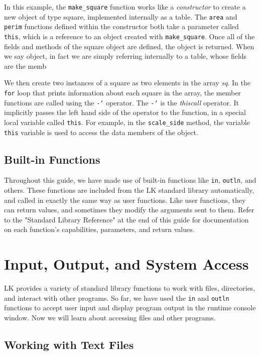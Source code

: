 \documentclass{article}
\newcommand\gt{\char`\>}
\begin{document}
In this example, the \texttt{make\_square} function works like a \emph{constructor} to create a new object of type square, implemented internally as a table.  The \texttt{area} and \texttt{perim} functions defined within the constructor both take a parameter called \texttt{this}, which is a reference to an object created with \texttt{make\_square}.  Once all of the fields and methods of the square object are defined, the object is returned.  When we say object, in fact we are simply referring internally to a table, whose fields are the memb

We then create two instances of a square as two elements in the array \emph{sq}.  In the \texttt{for} loop that prints information about each square in the array, the member functions are called using the \texttt{-\gt} operator.  The \texttt{-\gt} is the \emph{thiscall} operator.  It implicitly passes the left hand side of the operator to the function, in a special local variable called \texttt{this}.  For example, in the \texttt{scale\_side} method, the variable \texttt{this} variable is used to access the data members of the object.

\subsection{Built-in Functions}

Throughout this guide, we have made use of built-in functions like \texttt{in}, \texttt{outln}, and others.  These functions are included from the LK standard library automatically, and called in exactly the same way as user functions.  Like user functions, they can return values, and sometimes they modify the arguments sent to them.  Refer to the "Standard Library Reference" at the end of this guide for documentation on each function's capabilities, parameters, and return values.

\section{Input, Output, and System Access}

LK provides a variety of standard library functions to work with files, directories, and interact with other programs.  So far, we have used the \texttt{in} and \texttt{outln} functions to accept user input and display program output in the runtime console window.  Now we will learn about accessing files and other programs.

\subsection{Working with Text Files}
\end{document}
